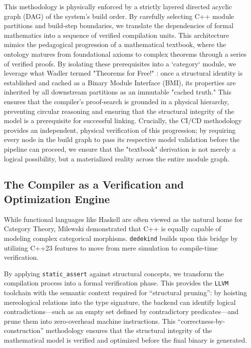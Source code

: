 \documentclass[11pt, a4paper]{report}
\begin{document}
This methodology is physically enforced by a strictly layered directed acyclic graph (DAG) of the system's build order.
By carefully selecting C++ module partitions and build-step boundaries, we translate the dependencies of formal mathematics into a sequence of verified compilation units. This architecture mimics the pedagogical progression of a mathematical textbook, where the ontology matures from foundational axioms to complex theorems through a series of verified proofs. By isolating these prerequisites into a `category` module, we leverage what Wadler termed "Theorems for Free!" \cite{wadler1989theorems}: once a structural identity is established and cached as a Binary Module Interface (BMI), its properties are inherited by all downstream partitions as an immutable "cached truth." This ensures that the compiler's proof-search is grounded in a physical hierarchy, preventing circular reasoning and ensuring that the structural integrity of the model is a prerequisite for successful linking. Crucially, the CI/CD methodology provides an independent, physical verification of this progression; by requiring every node in the build graph to pass its respective model validation before the pipeline can proceed, we ensure that the "textbook" derivation is not merely a logical possibility, but a materialized reality across the entire module graph.

\subsection{The Compiler as a Verification and Optimization Engine}
While functional languages like Haskell are often viewed as the natural home for Category Theory, Milewski \cite{milewski2019category} demonstrated that C++ is equally capable of modeling complex categorical morphisms. \texttt{dedekind} builds upon this bridge by utilizing C++23 features to move from mere simulation to compile-time verification. 

By applying \texttt{static\_assert} against structural concepts, we transform the compilation process into a formal verification phase. This provides the \texttt{LLVM} toolchain with the semantic context required for ``structural pruning'': by hoisting mereological relations into the type signature, the backend can identify logical contradictions—such as an empty set defined by contradictory predicates—and prune them into zero-overhead machine instructions. This ``correctness-by-construction'' methodology ensures that the structural integrity of the mathematical model is verified and optimized before the final binary is generated.
\end{document}
